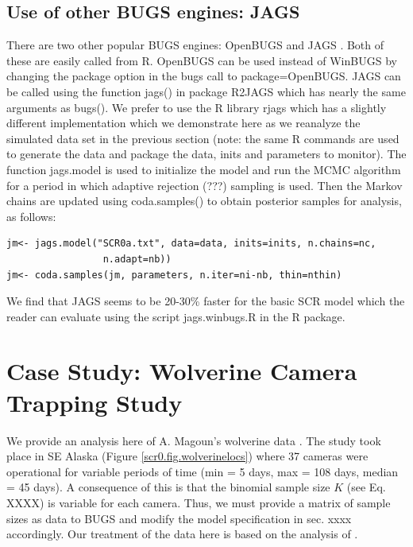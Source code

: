 \subsection{Use of other BUGS engines: JAGS}
There are two other popular BUGS engines: OpenBUGS \citep{thomas_etal:2006} and JAGS \citep{plummer:2003}. Both of these are easily called from R. OpenBUGS can be used instead of WinBUGS by changing the package option in the bugs call to package=OpenBUGS.  JAGS can be called using the function jags() in package R2JAGS which has nearly the same arguments as bugs().  We prefer to use the R library rjags \citep{plummer:2009} which has a slightly different implementation which we demonstrate here as we reanalyze the simulated data set in the previous section (note: the same R commands are used to generate the data and package the data, inits and parameters to monitor). The function jags.model is used to initialize the model and run the MCMC algorithm for a period in which adaptive rejection (???) sampling is used. Then the Markov chains are updated using coda.samples() to obtain posterior samples for analysis, as follows:

\begin{verbatim}
jm<- jags.model("SCR0a.txt", data=data, inits=inits, n.chains=nc,
                 n.adapt=nb))
jm<- coda.samples(jm, parameters, n.iter=ni-nb, thin=nthin)
\end{verbatim}

We find that JAGS seems to be 20-30\% faster for the basic SCR model which the reader can evaluate using the script jags.winbugs.R in the R package. 


\section{Case Study: Wolverine Camera Trapping Study}
We provide an analysis here of A. Magoun's wolverine data
\citep{magoun_etal:2011, royle_etal:2011}. The study took place in SE
Alaska (Figure \ref{scr0.fig.wolverinelocs}) where 37 cameras were
operational for variable periods of time (min = 5 days, max = 108
days, median = 45 days).  A consequence of this is that the binomial
sample size $K$ (see Eq. XXXX) is variable for each camera. Thus, we
must provide a matrix of sample sizes as data to BUGS and modify the
model specification in sec. xxxx accordingly. Our treatment of the
data here is based on the analysis of  \citet{royle_etal:2011}.

